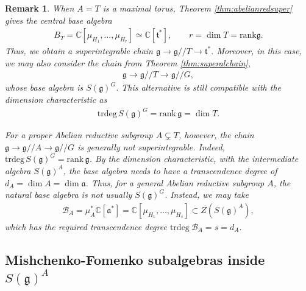 \documentclass[11pt,reqno]{amsart}
\newtheorem*{theorem A}{Main Theorem A}
\newtheorem*{theorem B}{Main Theorem B}
\newtheorem*{theorem C}{Main Theorem C}
\newtheorem*{theorem D}{Main Theorem D}
\theoremstyle{definition}
\theoremstyle{plain}
\newtheorem{remark}[theorem]{Remark}
\theoremstyle{conclusion}
\begin{document}
 
\begin{remark} 
\label{rem:abvsmaximaltorus}
When $A=T$ is a maximal torus, Theorem \ref{thm:abelianredsuper} gives the central base algebra \begin{align*}
B_T = \mathbb{C}[\mu_{H_1},\dots,\mu_{H_r}] \simeq \mathbb{C}[\mathfrak{t}^*], \qquad r=\dim T=\mathrm{rank}\mathfrak{g}.
\end{align*}  Thus, we obtain a superintegrable chain  $\mathfrak{g} \longrightarrow \mathfrak{g}//T \longrightarrow \mathfrak{t}^*$. Moreover, in this case, we may also consider the chain from Theorem \ref{thm:superalchain}, \begin{align*}
\mathfrak{g} \longrightarrow \mathfrak{g}//T \longrightarrow \mathfrak{g}//G,
\end{align*} whose base algebra is $S(\mathfrak{g})^G$. This alternative is still compatible with the dimension characteristic as \begin{align*}
\mathrm{trdeg} \, S(\mathfrak{g})^G = \mathrm{rank}\, \mathfrak{g} = \dim T.
\end{align*}

For a proper Abelian reductive subgroup $A\subsetneq T$, however, the chain  $\mathfrak{g} \longrightarrow \mathfrak{g}//A \longrightarrow \mathfrak{g}//G$ is generally not superintegrable. Indeed,  $\mathrm{trdeg} \, S(\mathfrak{g})^G = \mathrm{rank}\, \mathfrak{g}$. By the dimension characteristic, with the intermediate algebra $S(\mathfrak{g})^A$, the base algebra needs to have a transcendence degree of $d_A = \dim A= \dim\mathfrak{a}$. Thus, for a general Abelian reductive subgroup $A$, the natural base algebra is not usually $S(\mathfrak{g})^G$. Instead, we may take \begin{align*}
\mathcal{B}_A = \mu_A^*\mathbb{C}[\mathfrak{a}^*] = \mathbb{C}[\mu_{H_1},\dots,\mu_{H_s}] \subset Z \left(S(\mathfrak{g})^A\right),
\end{align*}  which has the required transcendence degree $\mathrm{trdeg} \ \mathcal{B} _A = s = d_A$. 
\end{remark}

\subsection{Mishchenko-Fomenko subalgebras inside \texorpdfstring{$S(\mathfrak{g})^A$}{S()A}}
\label{subsec:mfinsideA}
\end{document}
